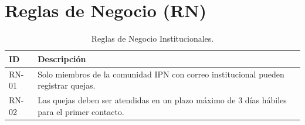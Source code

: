 \section{Reglas de Negocio (RN)}
\begin{table}[htbp]
    \centering
    \begin{tabular}{|l|l|p{8cm}|}
    \hline
    \textbf{ID} & \textbf{Descripción} \\ \hline
    RN-01 & Solo miembros de la comunidad IPN con correo institucional pueden registrar quejas. \\ \hline
    RN-02 & Las quejas deben ser atendidas en un plazo máximo de 3 días hábiles para el primer contacto. \\ \hline
    \end{tabular}
    \caption{Reglas de Negocio Institucionales.}
\end{table}